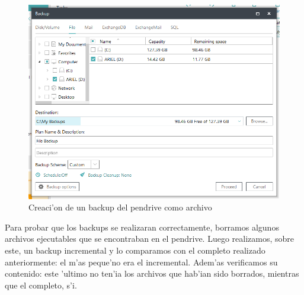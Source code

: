 \documentclass[11pt]{article}
\begin{document}
    \begin{figure}[H]
		\centering
		\includegraphics[width=.8\textwidth]{Images/easeus/pendrive/2-t2_file.png}
		\caption{Creaci'on de un backup del pendrive como archivo}
	\end{figure}
	
	\begin{figure}[H]
		\centering
		\hfill
		\vspace{7pt}
	\end{figure}
	
    Para probar que los backups se realizaran correctamente, borramos algunos archivos ejecutables que se encontraban en el pendrive. Luego realizamos, sobre este, un backup incremental y lo comparamos con el completo realizado anteriormente: el m'as peque'no era el incremental. Adem'as verificamos su contenido: este 'ultimo no ten'ia los archivos que hab'ian sido borrados, mientras que el completo, s'i.
    
\end{document}
